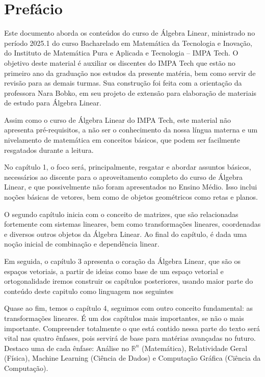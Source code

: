 \documentclass[../main.tex]{subfiles}
\begin{document}
	
	\chapter*{Prefácio}
	Este documento aborda os conteúdos do curso de Álgebra Linear, ministrado no período 2025.1 do curso Bacharelado em Matemática da Tecnologia e Inovação, do Instituto de Matemática Pura e Aplicada e Tecnologia -- IMPA Tech. O objetivo deste material é auxiliar os discentes do IMPA Tech que estão no primeiro ano da graduação nos estudos da presente matéria, bem como servir de revisão para as demais turmas. Sua construção foi feita com a orientação da professora Nara Bobko, em seu projeto de extensão para elaboração de materiais de estudo para Álgebra Linear.
	
	Assim como o curso de Álgebra Linear do IMPA Tech, este material não apresenta pré-requisitos, a não ser o conhecimento da nossa língua materna e um nivelamento de matemática em conceitos básicos, que podem ser facilmente resgatados durante a leitura.
	
	No capítulo 1, o foco será, principalmente, resgatar e abordar assuntos básicos, necessários ao discente para o aproveitamento completo do curso de Álgebra Linear, e que possivelmente não foram apresentados no Ensino Médio. Isso inclui noções básicas de vetores, bem como de objetos geométricos como retas e planos.
	
	O segundo capítulo inicia com o conceito de matrizes, que são relacionadas fortemente com sistemas lineares, bem como transformações lineares, coordenadas e diversos outros objetos da Álgebra Linear. Ao final do capítulo, é dada uma noção inicial de combinação e dependência linear.
	
	Em seguida, o capítulo 3 apresenta o coração da Álgebra Linear, que são os espaços vetoriais, a partir de ideias como base de um espaço vetorial e ortogonalidade iremos construir os capítulos posteriores, usando maior parte do conteúdo deste capitulo como linguagem nos seguintes
	
	Quase ao fim, temos o capítulo 4, seguimos com outro conceito fundamental: as transformações lineares. É um dos capítulos mais importantes, se não o mais importante. Compreender totalmente o que está contido nessa parte do texto será vital nas quatro ênfases, pois servirá de base para matérias avançadas no futuro. Destaco uma de cada ênfase: Análise no $\mathbb{R}^n$ (Matemática), Relatividade Geral (Física), Machine Learning (Ciência de Dados) e Computação Gráfica (Ciência da Computação).
	 
\end{document}
